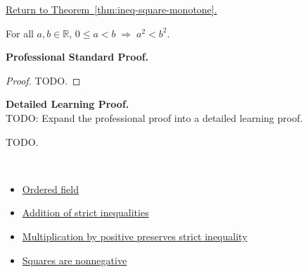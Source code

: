 \newpage
{}
\label{prf:ineq-square-monotone}

\begin{remark*}[Return]
\hyperref[thm:ineq-square-monotone]{Return to Theorem~\ref*{thm:ineq-square-monotone}.}
\end{remark*}

\begin{theorem*}
For all $a, b \in \mathbb{R}$,
$0 \le a < b \;\Rightarrow\; a^2 < b^2$.
\end{theorem*}

\textbf{Professional Standard Proof.}~\\
\begin{proof}
TODO.
\end{proof}

\textbf{Detailed Learning Proof.}~\\
TODO: Expand the professional proof into a detailed learning proof.


\begin{remark*}
TODO.
\end{remark*}

\begin{remark*}[Dependencies]~\\
\begin{itemize}
  \item \hyperref[def:ordered-field]{Ordered field}
  \item \hyperref[thm:ineq-add-inequalities]{Addition of strict inequalities}
  \item \hyperref[thm:ineq-multiply-positive]{Multiplication by positive preserves strict inequality}
  \item \hyperref[thm:squares-nonnegative]{Squares are nonnegative}
\end{itemize}
\end{remark*}
